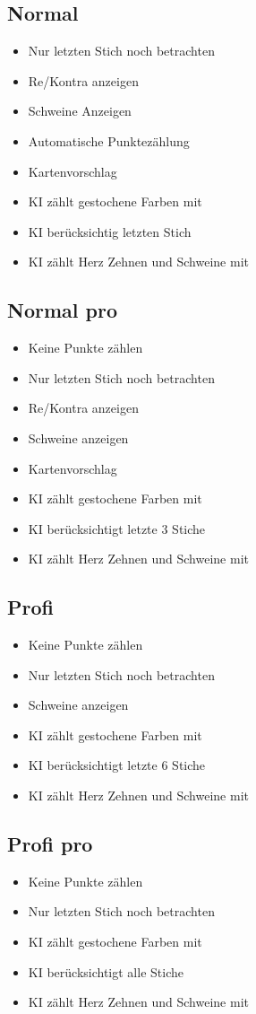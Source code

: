 \documentclass[12pt,a4paper]{article}
\begin{document}
\subsection{Normal}
\begin{itemize}
\item Nur letzten Stich noch betrachten
\item Re/Kontra anzeigen
\item Schweine Anzeigen
\item Automatische Punktezählung
\item Kartenvorschlag
\item KI zählt gestochene Farben mit
\item KI berücksichtig letzten Stich
\item KI zählt Herz Zehnen und Schweine mit
\end{itemize}
\subsection{Normal pro}
\begin{itemize}
\item Keine Punkte zählen
\item Nur letzten Stich noch betrachten
\item Re/Kontra anzeigen
\item Schweine anzeigen
\item Kartenvorschlag
\item KI zählt gestochene Farben mit
\item KI berücksichtigt letzte 3 Stiche
\item KI zählt Herz Zehnen und Schweine mit
\end{itemize}
\subsection{Profi}
\begin{itemize}
\item Keine Punkte zählen
\item Nur letzten Stich noch betrachten
\item Schweine anzeigen
\item KI zählt gestochene Farben mit
\item KI berücksichtigt letzte 6 Stiche
\item KI zählt Herz Zehnen und Schweine mit
\end{itemize}
\subsection{Profi pro}
\begin{itemize}
\item Keine Punkte zählen
\item Nur letzten Stich noch betrachten
\item KI zählt gestochene Farben mit
\item KI berücksichtigt alle Stiche
\item KI zählt Herz Zehnen und Schweine mit
\end{itemize}
\newpage
\end{document}
